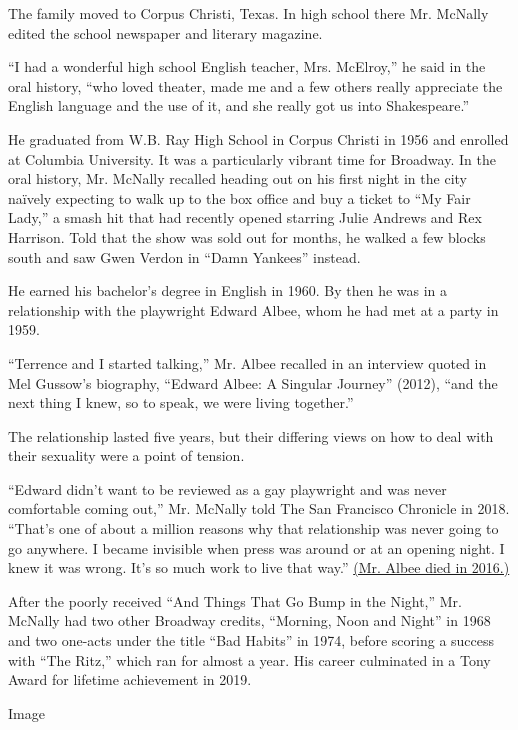 The family moved to Corpus Christi, Texas. In high school there Mr.
McNally edited the school newspaper and literary magazine.

``I had a wonderful high school English teacher, Mrs. McElroy,'' he said
in the oral history, ``who loved theater, made me and a few others
really appreciate the English language and the use of it, and she really
got us into Shakespeare.''

He graduated from W.B. Ray High School in Corpus Christi in 1956 and
enrolled at Columbia University. It was a particularly vibrant time for
Broadway. In the oral history, Mr. McNally recalled heading out on his
first night in the city naïvely expecting to walk up to the box office
and buy a ticket to ``My Fair Lady,'' a smash hit that had recently
opened starring Julie Andrews and Rex Harrison. Told that the show was
sold out for months, he walked a few blocks south and saw Gwen Verdon in
``Damn Yankees'' instead.

He earned his bachelor's degree in English in 1960. By then he was in a
relationship with the playwright Edward Albee, whom he had met at a
party in 1959.

``Terrence and I started talking,'' Mr. Albee recalled in an interview
quoted in Mel Gussow's biography, ``Edward Albee: A Singular Journey''
(2012), ``and the next thing I knew, so to speak, we were living
together.''

The relationship lasted five years, but their differing views on how to
deal with their sexuality were a point of tension.

``Edward didn't want to be reviewed as a gay playwright and was never
comfortable coming out,'' Mr. McNally told The San Francisco Chronicle
in 2018. ``That's one of about a million reasons why that relationship
was never going to go anywhere. I became invisible when press was around
or at an opening night. I knew it was wrong. It's so much work to live
that way.''
\href{https://www.nytimes3xbfgragh.onion/2016/09/17/arts/edward-albee-playwright-of-a-desperate-generation-dies-at-88.html}{(Mr.
Albee died in 2016.)}

After the poorly received ``And Things That Go Bump in the Night,'' Mr.
McNally had two other Broadway credits, ``Morning, Noon and Night'' in
1968 and two one-acts under the title ``Bad Habits'' in 1974, before
scoring a success with ``The Ritz,'' which ran for almost a year. His
career culminated in a Tony Award for lifetime achievement in 2019.

Image

